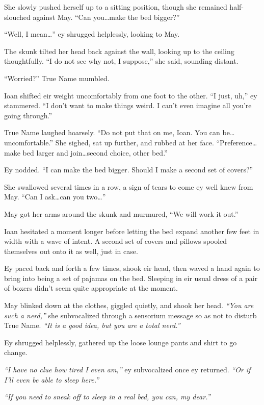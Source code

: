 She slowly pushed herself up to a sitting position, though she remained half-slouched against May. ``Can you\ldots make the bed bigger?''

``Well, I mean\ldots{}'' ey shrugged helplessly, looking to May.

The skunk tilted her head back against the wall, looking up to the ceiling thoughtfully. ``I do not see why not, I suppose,'' she said, sounding distant.

``Worried?'' True Name mumbled.

Ioan shifted eir weight uncomfortably from one foot to the other. ``I just, uh,'' ey stammered. ``I don't want to make things weird. I can't even imagine all you're going through.''

True Name laughed hoarsely. ``Do not put that on me, Ioan. You can be\ldots uncomfortable.'' She sighed, sat up further, and rubbed at her face. ``Preference\ldots make bed larger and join\ldots second choice, other bed.''

Ey nodded. ``I can make the bed bigger. Should I make a second set of covers?''

She swallowed several times in a row, a sign of tears to come ey well knew from May. ``Can I ask\ldots can you two\ldots{}''

May got her arms around the skunk and murmured, ``We will work it out.''

Ioan hesitated a moment longer before letting the bed expand another few feet in width with a wave of intent. A second set of covers and pillows spooled themselves out onto it as well, just in case.

Ey paced back and forth a few times, shook eir head, then waved a hand again to bring into being a set of pajamas on the bed. Sleeping in eir usual dress of a pair of boxers didn't seem quite appropriate at the moment.

May blinked down at the clothes, giggled quietly, and shook her head. \emph{``You are such a nerd,''} she subvocalized through a sensorium message so as not to disturb True Name. \emph{``It is a good idea, but you are a total nerd.''}

Ey shrugged helplessly, gathered up the loose lounge pants and shirt to go change.

\emph{``I have no clue how tired I even am,''} ey subvocalized once ey returned. \emph{``Or if I'll even be able to sleep here.''}

\emph{``If you need to sneak off to sleep in a real bed, you can, my dear.''}

